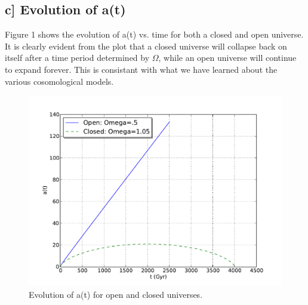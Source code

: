 \documentclass[a4paper,11pt]{article}
\begin{document}
\subsection*{c] Evolution of a(t)}
Figure 1 shows the evolution of a(t) vs. time for both a closed and open universe.  It is clearly evident from the plot that a closed universe will collapse back on itself after a time period determined by $\Omega$, while an open universe will continue to expand forever.  This is consistant with what we have learned about the various cosomological models.
\begin{figure}[h!]
\begin{center}
\includegraphics[scale=.7]{two_c.pdf}
\caption{Evolution of a(t) for open and closed universes.}
\end{center}
\end{figure}
\end{document}
